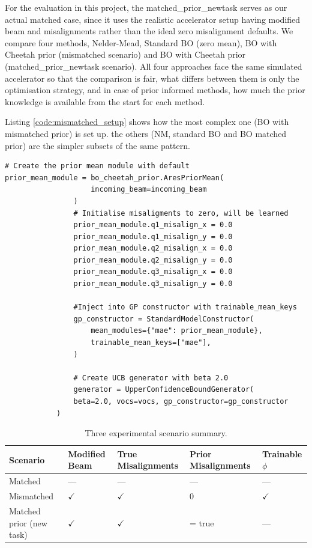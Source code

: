 For the evaluation in this project, the matched\_prior\_newtask serves as our actual matched case, since it uses the realistic 
accelerator setup having modified beam and misalignments rather than the ideal zero misalignment defaults. We compare four methods, 
Nelder-Mead, Standard BO (zero mean), BO with Cheetah prior (mismatched scenario) and BO with Cheetah prior (matched\_prior\_newtask scenario). 
All four approaches face the same simulated accelerator so that the comparison is fair,  what differs between them is only the optimisation strategy, 
and in case of prior informed methods, how much the prior knowledge is available from the start for each method. 



Listing \ref{code:mismatched_setup} shows how the most complex one (BO with mismatched prior) is set up.
the others (NM, standard BO and BO matched prior) are the simpler subsets of the same pattern. 

\begin{lstlisting}[caption={BO with Cheetah prior(mismatched setup).}, label={code:mismatched_setup}]
# Create the prior mean module with default
prior_mean_module = bo_cheetah_prior.AresPriorMean(
                    incoming_beam=incoming_beam
                )
                # Initialise misaligments to zero, will be learned
                prior_mean_module.q1_misalign_x = 0.0
                prior_mean_module.q1_misalign_y = 0.0
                prior_mean_module.q2_misalign_x = 0.0
                prior_mean_module.q2_misalign_y = 0.0
                prior_mean_module.q3_misalign_x = 0.0
                prior_mean_module.q3_misalign_y = 0.0 

                #Inject into GP constructor with trainable_mean_keys
                gp_constructor = StandardModelConstructor(
                    mean_modules={"mae": prior_mean_module},
                    trainable_mean_keys=["mae"], 
                )    
                
                # Create UCB generator with beta 2.0
                generator = UpperConfidenceBoundGenerator(
                beta=2.0, vocs=vocs, gp_constructor=gp_constructor
            )    
\end{lstlisting}


\begin{table} [htbp]
    \centering
    \small
    \begin{tabular}{p{2.5cm} p{2.0cm} p{2.0cm} p{2.0cm} p{2.0cm}}
        \toprule
        \textbf{Scenario} & \textbf{Modified Beam} & \textbf{True Misalignments} & \textbf{Prior Misalignments} & \textbf{Trainable $\phi$} \\
        \midrule
        Matched & --- & --- & --- & --- \\
        Mismatched & $\checkmark$ & $\checkmark$ & 0 & $\checkmark$ \\ 
        Matched prior (new task) & $\checkmark$ & $\checkmark$ & = true & ---  \\ 
        \bottomrule
    \end{tabular}
    \caption{Three experimental scenario summary.}
    \label{table:scenarios_summary}
\end{table}

